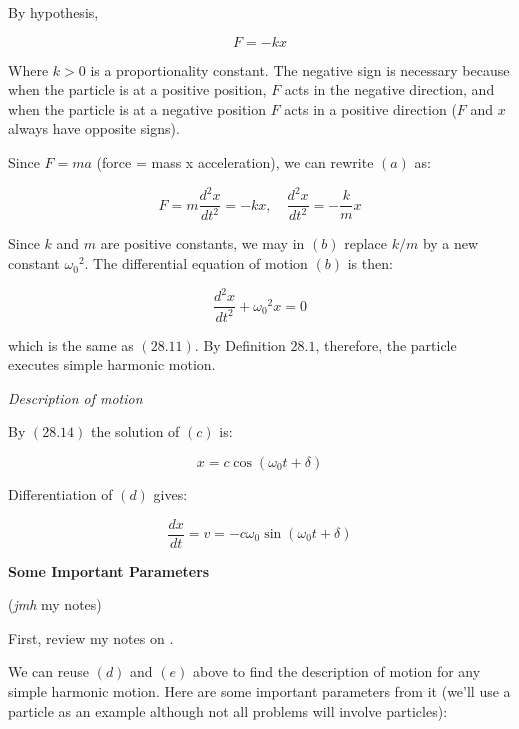 \documentclass{article}
\begin{document}
By hypothesis,

\[ \tag{a} F = -kx \]

Where $k > 0$ is a proportionality constant. The negative sign is necessary because when the particle is at a positive position, $F$ acts in the negative direction, and when the particle is at a negative position $F$ acts in a positive direction ($F$ and $x$ always have opposite signs).

Since $F = ma$ (force = mass x acceleration), we can rewrite $(a)$ as:

\[ \tag{b} F = m \frac{d^2 x}{dt^2} = -kx, \quad \frac{d^2 x}{dt^2} = - \frac{k}{m} x \]

Since $k$ and $m$ are positive constants, we may in $(b)$ replace $k/m$ by a new constant ${\omega_0}^2$. The differential equation of motion $(b)$ is then:

\[ \tag{c} \frac{d^2 x}{dt^2} + {\omega_0}^2x = 0 \]

which is the same as $(28.11)$. By Definition $28.1$, therefore, the particle executes simple harmonic motion.

\emph{Description of motion}

By $(28.14)$ the solution of $(c)$ is:

\[ \tag{d} x = c \cos{(\omega_0 t + \delta)} \]

Differentiation of $(d)$ gives:

\[ \tag{e} \frac{dx}{dt} = v = -c \omega_0 \sin{(\omega_0 t + \delta)} \]

\textbf{Some Important Parameters}

(\emph{jmh} my notes)

First, review my notes on .

We can reuse $(d)$ and $(e)$ above to find the description of motion for any simple harmonic motion. Here are some important parameters from it (we'll use a particle as an example although not all problems will involve particles):
\end{document}
